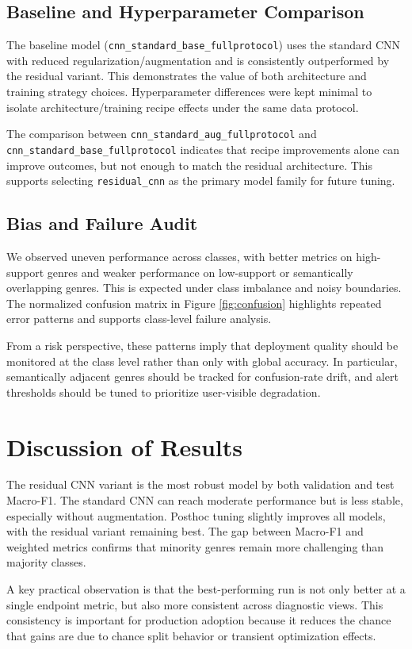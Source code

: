 \documentclass[11pt,a4paper]{article}
\begin{document}
\subsection{Baseline and Hyperparameter Comparison}
The baseline model (\texttt{cnn\_standard\_base\_fullprotocol}) uses the standard CNN with reduced regularization/augmentation and is consistently outperformed by the residual variant. This demonstrates the value of both architecture and training strategy choices. Hyperparameter differences were kept minimal to isolate architecture/training recipe effects under the same data protocol.

The comparison between \texttt{cnn\_standard\_aug\_fullprotocol} and \texttt{cnn\_standard\_base\_fullprotocol} indicates that recipe improvements alone can improve outcomes, but not enough to match the residual architecture. This supports selecting \texttt{residual\_cnn} as the primary model family for future tuning.

\subsection{Bias and Failure Audit}
We observed uneven performance across classes, with better metrics on high-support genres and weaker performance on low-support or semantically overlapping genres. This is expected under class imbalance and noisy boundaries. The normalized confusion matrix in Figure \ref{fig:confusion} highlights repeated error patterns and supports class-level failure analysis.

From a risk perspective, these patterns imply that deployment quality should be monitored at the class level rather than only with global accuracy. In particular, semantically adjacent genres should be tracked for confusion-rate drift, and alert thresholds should be tuned to prioritize user-visible degradation.

\section{Discussion of Results}
The residual CNN variant is the most robust model by both validation and test Macro-F1. The standard CNN can reach moderate performance but is less stable, especially without augmentation. Posthoc tuning slightly improves all models, with the residual variant remaining best. The gap between Macro-F1 and weighted metrics confirms that minority genres remain more challenging than majority classes.

A key practical observation is that the best-performing run is not only better at a single endpoint metric, but also more consistent across diagnostic views. This consistency is important for production adoption because it reduces the chance that gains are due to chance split behavior or transient optimization effects.
\end{document}
